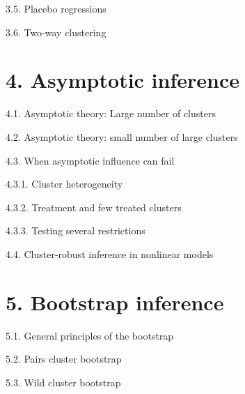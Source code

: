 \documentclass[xcolor=svgnames,dvipdfmx,cjk,aspectratio=169]{beamer}
\begin{document}
\begin{frame}{3.5. Placebo regressions}
\end{frame}

\begin{frame}{3.6. Two-way clustering}
\end{frame}

\section{4. Asymptotic inference}

\begin{frame}{4.1. Asymptotic theory: Large number of clusters}
\end{frame}

\begin{frame}{4.2. Asymptotic theory: small number of large clusters}
\end{frame}

\begin{frame}{4.3. When asymptotic influence can fail}
\end{frame}

\begin{frame}{4.3.1. Cluster heterogeneity}
\end{frame}

\begin{frame}{4.3.2. Treatment and few treated clusters}
\end{frame}

\begin{frame}{4.3.3. Testing several restrictions}
\end{frame}

\begin{frame}{4.4. Cluster-robust inference in nonlinear models}
\end{frame}

\section{5. Bootstrap inference}

\begin{frame}{5.1. General principles of the bootstrap}
\end{frame}

\begin{frame}{5.2. Pairs cluster bootstrap}
\end{frame}

\begin{frame}{5.3. Wild cluster bootstrap}
\end{frame}
\end{document}
